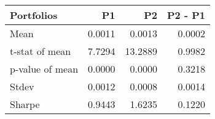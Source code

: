 \begin{tabular}{lrrr}
\toprule
Portfolios & P1 & P2 & P2 - P1 \\
\midrule
Mean & 0.0011 & 0.0013 & 0.0002 \\
t-stat of mean & 7.7294 & 13.2889 & 0.9982 \\
p-value of mean & 0.0000 & 0.0000 & 0.3218 \\
Stdev & 0.0012 & 0.0008 & 0.0014 \\
Sharpe & 0.9443 & 1.6235 & 0.1220 \\
\bottomrule
\end{tabular}

